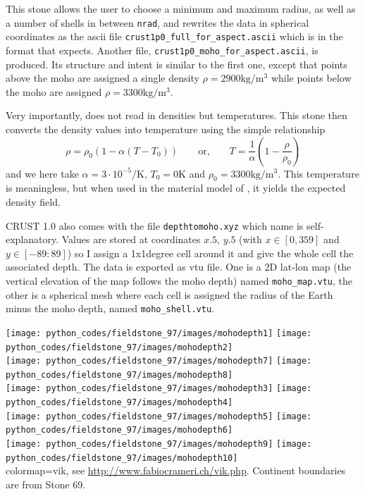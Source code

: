 This stone allows the user to choose a minimum and maximum radius, as well as a 
number of shells in between {\tt nrad}, and rewrites the data in spherical coordinates 
as the ascii file {\tt crust1p0\_full\_for\_aspect.ascii} which is in the format that \aspect{} expects.
Another file, {\tt crust1p0\_moho\_for\_aspect.ascii}, is produced. Its structure and intent
is similar to the first one, except that points above the moho are assigned a single 
density $\rho=2900\si{\kilo\gram\per\cubic\metre}$ while points below the 
moho are assigned $\rho=3300\si{\kilo\gram\per\cubic\metre}$.

Very importantly, \aspect{} does not read in densities but temperatures. This stone then 
converts the density values into temperature using the simple relationship
\[
\rho = \rho_0 (1-\alpha(T-T_0))
\qquad \text{or,} \qquad
T= \frac{1}{\alpha} \left(1 - \frac{\rho}{\rho_0} \right)
\]
and we here take $\alpha = 3\cdot 10^{-5}\si{\per\kelvin}$, 
$T_0=0\si{\kelvin}$ and $\rho_0=3300\si{\kilo\gram\per\cubic\metre}$. 
This temperature is meaningless, but when used in the material model of \aspect{}, 
it yields the expected density field. 

CRUST 1.0 also comes with the file {\tt depthtomoho.xyz} which name is 
self-explanatory. Values are stored at coordinates $x.5$, $y.5$ (with $x\in[0,359]$
and $y\in [-89:89]$) so I assign a 1x1degree cell around it and give the whole cell 
the associated depth.
The data is exported as vtu file. One is a 2D lat-lon map (the vertical 
elevation of the map follows the moho depth) named {\tt moho\_map.vtu}, the other is a 
spherical mesh where each cell is assigned the radius of the Earth minus the moho depth, 
named {\tt moho\_shell.vtu}.

\begin{center}
\texttt{[image: python\_codes/fieldstone\_97/images/mohodepth1]}
\texttt{[image: python\_codes/fieldstone\_97/images/mohodepth2]}\\
\texttt{[image: python\_codes/fieldstone\_97/images/mohodepth7]}
\texttt{[image: python\_codes/fieldstone\_97/images/mohodepth8]}\\
\texttt{[image: python\_codes/fieldstone\_97/images/mohodepth3]}
\texttt{[image: python\_codes/fieldstone\_97/images/mohodepth4]}\\
\texttt{[image: python\_codes/fieldstone\_97/images/mohodepth5]}
\texttt{[image: python\_codes/fieldstone\_97/images/mohodepth6]}\\
\texttt{[image: python\_codes/fieldstone\_97/images/mohodepth9]}
\texttt{[image: python\_codes/fieldstone\_97/images/mohodepth10]}\\
{\captionfont colormap=vik, see \url{http://www.fabiocrameri.ch/vik.php}.
Continent boundaries are from Stone 69.}
\end{center}

